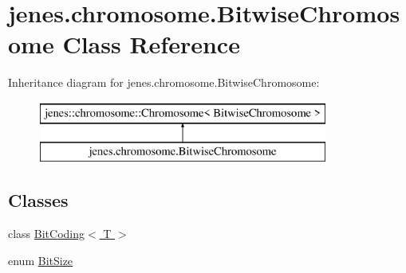 \hypertarget{classjenes_1_1chromosome_1_1_bitwise_chromosome}{\section{jenes.\-chromosome.\-Bitwise\-Chromosome Class Reference}
\label{classjenes_1_1chromosome_1_1_bitwise_chromosome}
}
Inheritance diagram for jenes.\-chromosome.\-Bitwise\-Chromosome\-:\begin{figure}[H]
\begin{center}
\leavevmode
\includegraphics[height=2.000000cm]{classjenes_1_1chromosome_1_1_bitwise_chromosome}
\end{center}
\end{figure}
\subsection*{Classes}
\begin{DoxyCompactItemize}
\item 
class \hyperlink{classjenes_1_1chromosome_1_1_bitwise_chromosome_1_1_bit_coding_3_01_t_01_4}{Bit\-Coding$<$ T $>$}
\item 
enum \hyperlink{enumjenes_1_1chromosome_1_1_bitwise_chromosome_1_1_bit_size}{Bit\-Size}
\end{DoxyCompactItemize}
